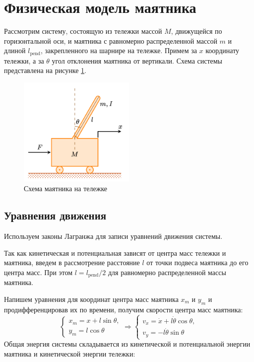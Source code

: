 \section{Физическая модель маятника}

Рассмотрим систему, состоящую из тележки массой $M$, движущейся по горизонтальной оси, и маятника с равномерно распределенной массой $m$ и длиной $l_{\text{pend}}$,
закрепленного на шарнире на тележке. Примем за $x$ координату тележки, а за $\theta$ угол отклонения маятника от вертикали. Схема системы представлена на рисунке \ref{fig:pendulum}.
\begin{figure}[ht!]
    \centering
    \includegraphics[width=0.5\textwidth]{media/cart.png}
    \caption{Схема маятника на тележке}
    \label{fig:pendulum}
\end{figure}

\subsection{Уравнения движения}
Используем законы Лагранжа для записи уравнений движения системы. 

Так как кинетическая и потенциальная зависят от центра масс тележки и маятника, введем в рассмотрение расстояние $l$ 
от точки подвеса маятника до его центра масс. При этом $l = l_{\text{pend}}/2$ для равномерно распределенной массы маятника.

Напишем уравнения для координат центра масс маятника $x_m$ и $y_m$ и продифференцировав их по времени, получим скорости центра масс маятника:
\begin{equation}
    \begin{cases}
        x_m = x + l\sin\theta, \\
        y_m = l\cos\theta
    \end{cases} \Rightarrow
    \begin{cases}
        v_x = \dot{x} + l\dot{\theta}\cos\theta, \\
        v_y = -l\dot{\theta}\sin\theta
    \end{cases}
\end{equation}
Общая энергия системы складывается из кинетической и потенциальной энергии маятника и кинетической энергии тележки:

